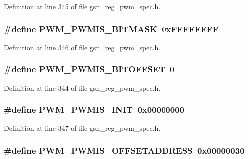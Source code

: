 Definition at line 345 of file gsn\_\-reg\_\-pwm\_\-spec.h.

\hypertarget{a00565_ac3bcdcc018853a301f78c32671b9c81d}{
\subsubsection[{PWM\_\-PWMIS\_\-BITMASK}]{\setlength{\rightskip}{0pt plus 5cm}\#define PWM\_\-PWMIS\_\-BITMASK~0xFFFFFFFF}}
\label{a00565_ac3bcdcc018853a301f78c32671b9c81d}


Definition at line 346 of file gsn\_\-reg\_\-pwm\_\-spec.h.

\hypertarget{a00565_aecc69ca8656aab951d4a6e4657b199f2}{
\subsubsection[{PWM\_\-PWMIS\_\-BITOFFSET}]{\setlength{\rightskip}{0pt plus 5cm}\#define PWM\_\-PWMIS\_\-BITOFFSET~0}}
\label{a00565_aecc69ca8656aab951d4a6e4657b199f2}


Definition at line 344 of file gsn\_\-reg\_\-pwm\_\-spec.h.

\hypertarget{a00565_abd79dfa7ccc23e9f10c6962a4da55800}{
\subsubsection[{PWM\_\-PWMIS\_\-INIT}]{\setlength{\rightskip}{0pt plus 5cm}\#define PWM\_\-PWMIS\_\-INIT~0x00000000}}
\label{a00565_abd79dfa7ccc23e9f10c6962a4da55800}


Definition at line 347 of file gsn\_\-reg\_\-pwm\_\-spec.h.

\hypertarget{a00565_ae8efb404ac600ed96a7e07f5827853a3}{
\subsubsection[{PWM\_\-PWMIS\_\-OFFSETADDRESS}]{\setlength{\rightskip}{0pt plus 5cm}\#define PWM\_\-PWMIS\_\-OFFSETADDRESS~0x00000030}}
\label{a00565_ae8efb404ac600ed96a7e07f5827853a3}


